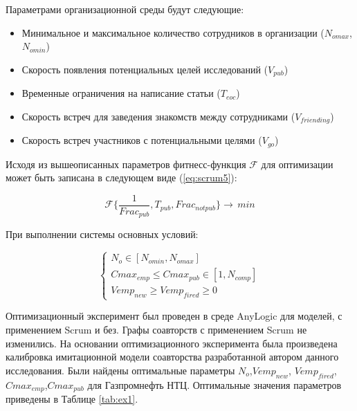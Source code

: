 Параметрами организационной среды будут следующие:

\begin{itemize}
\tightlist
\item
  Минимальное и максимальное количество сотрудников в организации
  ($N_{omax}$,$N_{omin}$)
\item
  Скорость появления потенциальных целей исследований ($V_{pub}$)
\item
  Временные ограничения на написание статьи ($T_{eoc}$)
\item
  Скорость встреч для заведения знакомств между сотрудниками
  ($V_{friending}$)
\item
  Скорость встреч участников с потенциальными целями
  ($V_{go}$)
\end{itemize}

Исходя из вышеописанных параметров фитнесс-функция $\mathcal{F}$ для оптимизации может быть записана в следующем виде (\ref{eq:scrum5}):

\begin{equation} 
\label{eq:scrum5}
\mathcal{F}\bigg\{ \frac{1}{Frac_{pub}}, T_{pub}, Frac_{notpub} \bigg\} \rightarrow \, min
\end{equation}

При выполнении системы основных условий:

\begin{equation} 
\left\{ \begin{array}{rcl}
N_o \in [ N_{omin}, N_{omax} ]\\ 
Cmax_{emp} \leq Cmax_{pub} \in [ 1, N_{comp} ]\\
Vemp_{new} \geq Vemp_{fired} \geq 0
\end{array}\right.
\label{eq:scrum6}
\end{equation}

Оптимизационный эксперимент был проведен в среде AnyLogic для моделей, с применением Scrum и без. 
Графы соавторств с применением Scrum не изменились.
На основании оптимизационного эксперимента была произведена калибровка имитационной модели соавторства разработанной автором данного исследования. 
Были найдены оптимальные параметры $N_{o}$,$Vemp_{new}$, $Vemp_{fired}$,$Cmax_{emp}$,$Cmax_{pub}$ для Газпромнефть НТЦ. 
Оптимальные значения параметров приведены в Таблице \ref{tab:ex1}.


